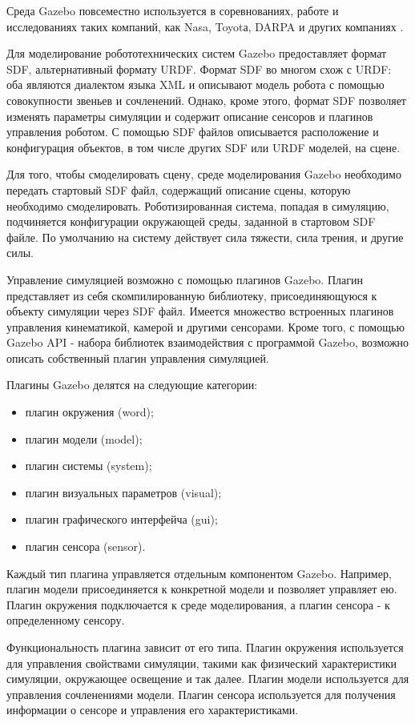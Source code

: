 \documentclass[oneside,final,14pt]{extreport}
\newcommand{\indentSpace}{1.25cm}
\begin{document}
Среда Gazebo повсеместно используется в соревнованиях, работе и исследованиях таких компаний, как Nasa, Toyotа, DARPA и других компаниях \cite{gazebosim.org}. 

Для моделирование робототехнических систем Gazebo предоставляет формат SDF, альтернативный формату URDF. Формат SDF во многом схож с URDF: оба  являются диалектом языка XML и описывают модель робота с помощью  совокупности звеньев и сочленений. Однако, кроме этого, формат SDF позволяет изменять параметры симуляции и содержит описание сенсоров и плагинов управления роботом. С помощью SDF файлов описывается расположение и конфигурация объектов, в том числе других SDF или URDF моделей, на сцене. 

Для того, чтобы смоделировать сцену, среде моделирования Gazebo необходимо передать стартовый SDF файл, содержащий описание сцены, которую необходимо смоделировать. Роботизированная система, попадая в симуляцию, подчиняется конфигурации окружающей среды, заданной в стартовом SDF файле. По умолчанию на систему действует сила тяжести, сила трения, и другие силы. 

Управление симуляцией возможно с помощью плагинов Gazebo. Плагин представляет из себя скомпилированную библиотеку, присоединяющуюся к объекту симуляции через SDF файл. Имеется множество встроенных плагинов управления кинематикой, камерой и другими сенсорами. Кроме того, с помощью Gazebo API - набора библиотек взаимодействия с программой Gazebo, возможно описать собственный плагин управления симуляцией. 

Плагины Gazebo делятся на следующие категории:
\begin{itemize}
\item плагин окружения (word);
\setlength{\itemindent}{-\indentSpace }
\item плагин модели (model);
\item плагин системы (system);
\item плагин визуальных параметров (visual);
\item плагин графического интерфейча (gui);
\item плагин сенсора (sensor).
\end{itemize}

Каждый тип плагина управляется отдельным компонентом Gazebo. Например, плагин модели присоединяется к конкретной модели и позволяет управляет ею. Плагин окружения подключается к среде моделирования, а плагин сенсора - к определенному сенсору. 

Функциональность плагина зависит от его типа. Плагин окружения используется для управления свойствами симуляции, такими как физический характеристики симуляции, окружающее освещение и так далее. Плагин модели используется для управления сочленениями модели. Плагин сенсора используется для получения информации о сенсоре и управления его характеристиками.
\end{document}
